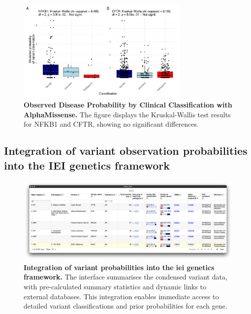 \begin{figure}[h]
  \centering
  \includegraphics[width=0.75\textwidth]{../images/p_alphamissense_kw.pdf}
  \caption{\textbf{Observed Disease Probability by Clinical Classification with AlphaMissense.} The figure displays the Kruskal-Wallis test results for NFKB1 and CFTR, showing no significant differences.}
  \label{fig:alphamissense_kw}
\end{figure}


\subsection{Integration of variant observation probabilities into the IEI genetics framework}

\begin{figure}[h]
  \centering
  \includegraphics[width=.8\textwidth]{../images/var_risk_est_iei_genetics.png}
  \caption{
    \textbf{Integration of variant probabilities into the \ac{iei} genetics framework.}
    The interface summarises the condensed variant data, with pre-calculated summary statistics and dynamic links to external databases. This integration enables immediate access to detailed variant classifications and prior probabilities for each gene.
  }
  \label{fig:var_risk_est_iei_genetics}
\end{figure}







